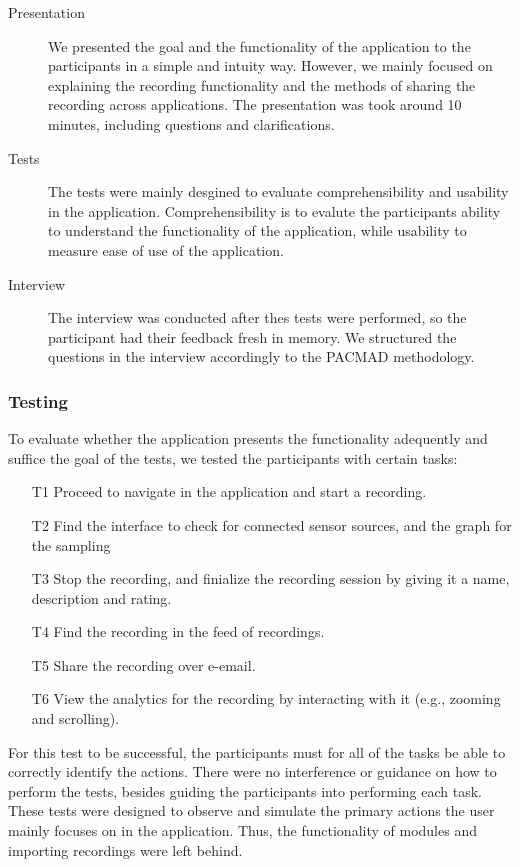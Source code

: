\begin{description}
    \item[Presentation] We presented the goal and the functionality of the application to the participants in a simple and intuity way. However, we mainly focused on explaining the recording functionality and the methods of sharing the recording across applications. The presentation was took around 10 minutes, including questions and clarifications.  
    \item[Tests] The tests were mainly desgined to evaluate comprehensibility and usability in the application. Comprehensibility is to evalute the participants ability to understand the functionality of the application, while usability to measure ease of use of the application.
    \item[Interview] The interview was conducted after thes tests were performed, so the participant had their feedback fresh in memory. We structured the questions in the interview accordingly to the PACMAD methodology. 
\end{description}

\subsubsection{Testing}
To evaluate whether the application presents the functionality adequently and suffice the goal of the tests, we tested the participants with certain tasks:
\begin{itemize}
    \item[T1] Proceed to navigate in the application and start a recording.
    \item[T2] Find the interface to check for connected sensor sources, and the graph for the sampling
    \item[T3] Stop the recording, and finialize the recording session by giving it a name, description and rating.
    \item[T4] Find the recording in the feed of recordings. 
    \item[T5] Share the recording over e-email.
    \item[T6] View the analytics for the recording by interacting with it (e.g., zooming and scrolling). 
\end{itemize}

For this test to be successful, the participants must for all of the tasks be able to correctly identify the actions. There were no interference or guidance on how to perform the tests, besides guiding the participants into performing each task. These tests were designed to observe and simulate the primary actions the user mainly focuses on in the application. Thus, the functionality of modules and importing recordings were left behind. 


